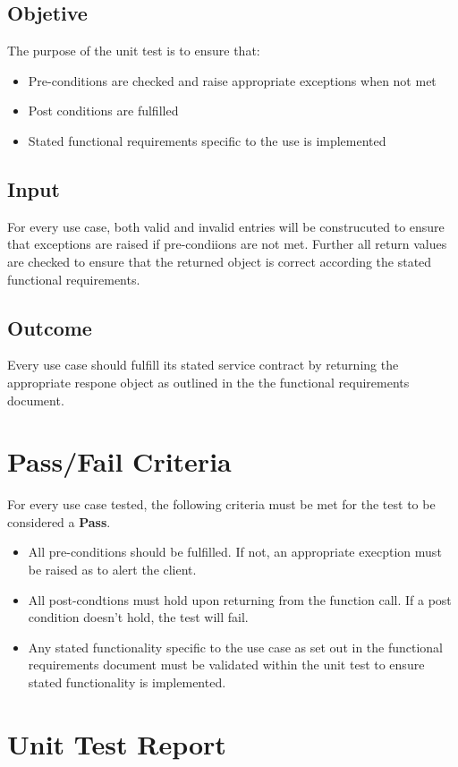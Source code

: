 \documentclass[11pt,a4paper]{article}
\begin{document}
\subsection{Objetive}
The purpose of the unit test is to ensure that:
\begin{itemize}
  \item Pre-conditions are checked and raise appropriate exceptions when not met
  \item Post conditions are fulfilled
  \item Stated functional requirements specific to the use is implemented
\end{itemize}

\subsection{Input}
For every use case, both valid and invalid entries will be construcuted to
ensure that exceptions are raised if pre-condiions are not met. Further all return
values are checked to ensure that the returned object is correct according the stated
functional requirements.

\subsection{Outcome}
Every use case should fulfill its stated service contract by returning the
appropriate respone object as outlined in the the functional requirements
document.

\section{Pass/Fail Criteria}
For every use case tested, the following criteria must be met for the test to be
considered a \textbf{Pass}.
\begin{itemize}
  \item All pre-conditions should be fulfilled. If not, an appropriate execption
    must be raised as to alert the client.
  \item All post-condtions must hold upon returning from the function call. If 
    a post condition doesn't hold, the test will fail.
  \item Any stated functionality specific to the use case as set out in the
    functional requirements document must be validated within the unit test to
    ensure stated functionality is implemented.
\end{itemize}

\section{Unit Test Report}
\end{document}

